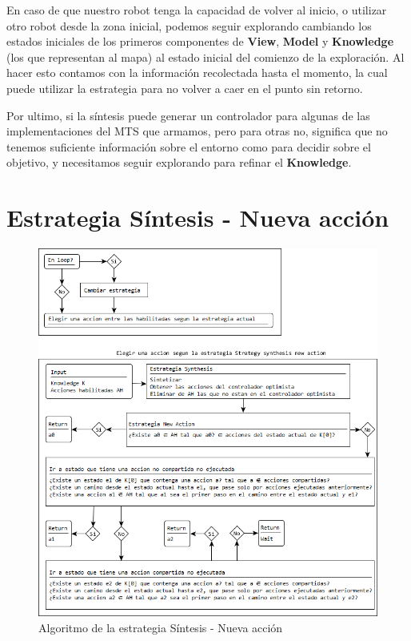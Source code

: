 \vspace{\baselineskip}
En caso de que nuestro robot tenga la capacidad de volver al inicio, o utilizar otro robot desde la zona inicial, podemos seguir explorando cambiando los
estados iniciales de los primeros componentes de \textbf{View}, \textbf{Model} y \textbf{Knowledge} (los que representan al mapa) al estado inicial del comienzo
de la exploración. Al hacer esto contamos con la información recolectada hasta el momento, la cual puede utilizar la estrategia para no volver a caer en el
punto sin retorno.

\vspace{\baselineskip}
Por ultimo, si la síntesis puede generar un controlador para algunas de las implementaciones del MTS que armamos, pero para otras no, significa que no tenemos
suficiente información sobre el entorno como para decidir sobre el objetivo, y necesitamos seguir explorando para refinar el \textbf{Knowledge}.

\section{Estrategia Síntesis - Nueva acción}

\begin{figure}[H]
  \centering
    \includegraphics[width=1.0\textwidth]{Imagenes/Algoritmo/Algoritmo_elegir.png}
  \caption{Algoritmo de la estrategia Síntesis - Nueva acción}
  \label{fig:Algoritmo_elegir}
\end{figure}

